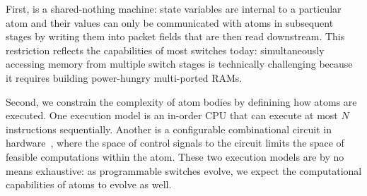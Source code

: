 First, \absmachine is a shared-nothing machine: state variables are internal to
a particular atom and their values can only be communicated with atoms in
subsequent stages by writing them into packet fields that are then read
downstream.  This restriction reflects the capabilities of most switches today:
simultaneously accessing memory from multiple switch stages is technically
challenging because it requires building power-hungry multi-ported RAMs.

Second, we constrain the complexity of atom bodies by definining how atoms are
executed. One execution model is an in-order CPU that can execute at most $N$
instructions sequentially. Another is a configurable combinational circuit in
hardware~\cite{dataflow}, where the space of control signals to the circuit
limits the space of feasible computations within the atom. These two execution
models are by no means exhaustive: as programmable switches evolve, we expect
the computational capabilities of atoms to evolve as well.

